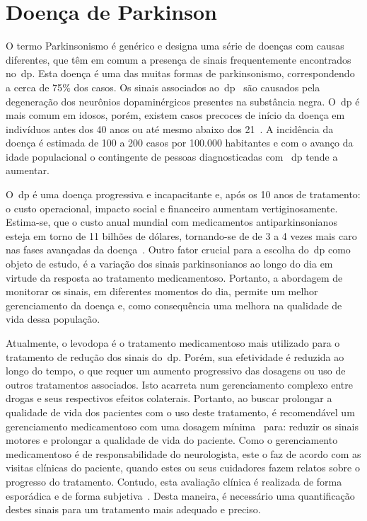 \section{Doença de Parkinson}\label{section:doenca_parkinson}
O termo Parkinsonismo é genérico e designa uma série de doenças com causas diferentes, que têm em comum a presença de sinais frequentemente encontrados no~\ac{dp}. Esta doença é uma das muitas formas de parkinsonismo, correspondendo a cerca de 75$\%$ dos casos. Os sinais associados ao~\ac{dp}~\cite{protpar010} são causados pela degeneração dos neurônios dopaminérgicos presentes na substância negra. O~\ac{dp} é mais comum em idosos, porém, existem casos precoces de início da doença em indivíduos antes dos 40 anos ou até mesmo abaixo dos 21~\cite{menezes2003}. A incidência da doença é estimada de 100 a 200 casos por 100.000 habitantes e com o avanço da idade populacional o contingente de pessoas diagnosticadas com ~\ac{dp} tende a aumentar.

O~\ac{dp} é uma doença progressiva e incapacitante e, após os 10 anos de tratamento: o custo operacional, impacto social e financeiro aumentam vertiginosamente. Estima-se, que o custo anual mundial com medicamentos antiparkinsonianos esteja em torno de 11 bilhões de dólares, tornando-se de de 3 a 4 vezes mais caro nas fases avançadas da doença~\cite{protpar010}. Outro fator crucial para a escolha do~\ac{dp} como objeto de estudo, é a variação dos sinais parkinsonianos ao longo do dia em virtude da resposta ao tratamento medicamentoso. Portanto, a abordagem de monitorar os sinais, em diferentes momentos do dia, permite um melhor gerenciamento da doença e, como consequência uma melhora na qualidade de vida dessa população.


Atualmente, o levodopa é o tratamento medicamentoso mais utilizado para o tratamento de redução dos sinais do~\ac{dp}. Porém, sua efetividade é reduzida ao longo do tempo, o que requer um aumento progressivo das dosagens ou uso de outros tratamentos associados. Isto acarreta num gerenciamento complexo entre drogas e seus respectivos efeitos colaterais. Portanto, ao buscar prolongar a qualidade de vida dos pacientes com o uso deste tratamento, é recomendável um gerenciamento medicamentoso com uma dosagem mínima~\cite{national2006parkinson} para: reduzir os sinais motores e prolongar a qualidade de vida do paciente. Como o gerenciamento medicamentoso é de responsabilidade do neurologista, este o faz de acordo com as visitas clínicas do paciente, quando estes ou seus cuidadores fazem relatos sobre o progresso do tratamento. Contudo, esta avaliação clínica é realizada de forma esporádica e de forma subjetiva~\cite{protpar010,quantitativeparkinson2011}. Desta maneira, é necessário uma quantificação destes sinais para um tratamento mais adequado e preciso. 

